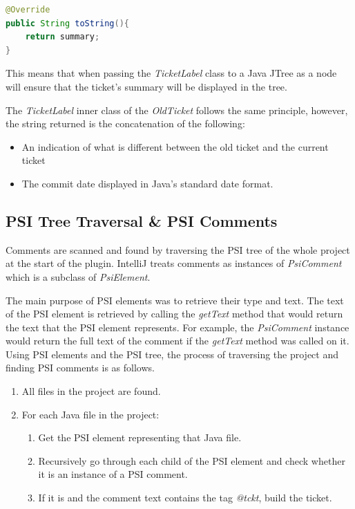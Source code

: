 \documentclass{4thYearProject}
\begin{document}
\begin{lstlisting}[language=Java, basicstyle=\footnotesize\tt,        % the size of the fonts that are used for the code
  frame=single,                    % adds a frame around the code
  language=Java,                 % the language of the code
  keywordstyle=\bf]
@Override
public String toString(){
	return summary;
}
\end{lstlisting}

This means that when passing the \textit{TicketLabel} class to a Java JTree as a node will ensure that the ticket's summary will be displayed in the tree. 

The \textit{TicketLabel} inner class of the \textit{OldTicket} follows the same principle, however, the string returned is the concatenation of the following:

\begin{itemize}
\item An indication of what is different between the old ticket and the current ticket
\item The commit date displayed in Java's standard date format.
\end{itemize}  

\subsection{PSI Tree Traversal \& PSI Comments}

Comments are scanned and found by traversing the PSI tree of the whole project at the start of the plugin. IntelliJ treats comments as instances of \textit{PsiComment} which is a subclass of \textit{PsiElement}. 

The main purpose of PSI elements was to retrieve their type and text. The text of the PSI element is retrieved by calling the \textit{getText} method that would return the text that the PSI element represents. For example, the \textit{PsiComment} instance would return the full text of the comment if the \textit{getText} method was called on it. Using PSI elements and the PSI tree, the process of traversing the project and finding PSI comments is as follows.

\begin{enumerate}
\item All files in the project are found.
\item For each Java file in the project:
\begin{enumerate}
\item Get the PSI element representing that Java file.
\item Recursively go through each child of the PSI element and check whether it is an instance of a PSI comment.
\item If it is and the comment text contains the tag \textit{@tckt}, build the ticket.
\end{enumerate}
\end{enumerate}
\end{document}
